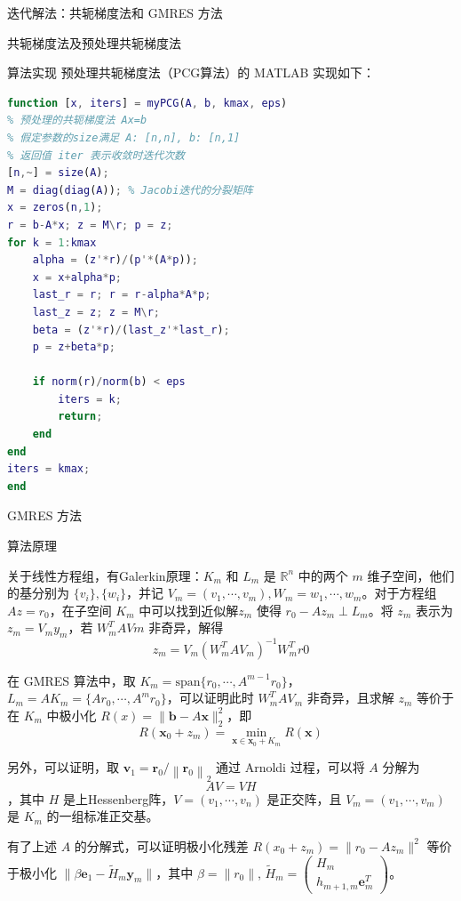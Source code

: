 \documentclass[a4paper]{article}
\begin{document}
\begin{multicols}{2}
\begin{section}{迭代解法：共轭梯度法和 GMRES 方法}
\begin{subsection}{共轭梯度法及预处理共轭梯度法}
\begin{subsubsection}{算法实现}
			预处理共轭梯度法（PCG算法）的 MATLAB 实现如下：
			
			\begin{lstlisting}[language=Matlab]
function [x, iters] = myPCG(A, b, kmax, eps)
% 预处理的共轭梯度法 Ax=b
% 假定参数的size满足 A: [n,n], b: [n,1]
% 返回值 iter 表示收敛时迭代次数
[n,~] = size(A);
M = diag(diag(A)); % Jacobi迭代的分裂矩阵
x = zeros(n,1);
r = b-A*x; z = M\r; p = z;
for k = 1:kmax
    alpha = (z'*r)/(p'*(A*p));
    x = x+alpha*p;
    last_r = r; r = r-alpha*A*p;
    last_z = z; z = M\r;
    beta = (z'*r)/(last_z'*last_r);
    p = z+beta*p;
    
    if norm(r)/norm(b) < eps
        iters = k;
        return;
    end
end
iters = kmax;
end
			\end{lstlisting}
		
		\end{subsubsection}
		
	\end{subsection}
	
	\begin{subsection}{GMRES 方法}
	
		\begin{subsubsection}{算法原理}
		
			关于线性方程组，有Galerkin原理：$K_m$ 和 $L_m$ 是 $\mathbb{R}^n$ 中的两个 $m$ 维子空间，他们的基分别为 $\{v_i\}, \{w_i\}$，并记 $V_m = (v_1,\cdots,v_m), W_m = {w_1,\cdots,w_m}$。对于方程组 $Az=r_0$，在子空间 $K_m$ 中可以找到近似解$z_m$ 使得 $r_0-Az_m \perp L_m$。将 $z_m$ 表示为 $z_m = V_m y_m$，若 $W_m^TAVm$ 非奇异，解得
			$$z_m = V_m(W_m^TAV_m)^{-1}W_m^Tr0$$
			
			在 GMRES 算法中，取 $K_m = \text{span}\{r_0,\cdots, A^{m-1}r_0\}$，$ L_m=AK_m=\{Ar_0, \cdots, A^mr_0\}$，可以证明此时 $W_m^TAV_m$ 非奇异，且求解 $z_m$ 等价于在 $K_m$ 中极小化 $R(x)=\|\mathbf{b}-A \mathbf{x}\|_{2}^2$，即 $$R(\mathbf{x}_{0}+z_m)=\min _{\mathbf{x} \in \mathbf{x}_{0}+K_{m}} R(\mathbf{x})$$
			
			另外，可以证明，取 $\mathbf{v}_{1}=\mathbf{r}_{0} /\left\|\mathbf{r}_{0}\right\|_{2}$ 通过 Arnoldi 过程，可以将 $A$ 分解为 $$AV = VH$$，其中 $H$ 是上Hessenberg阵，$V = (v_1, \cdots, v_n)$ 是正交阵，且 $V_m = (v_1,\cdots,v_m)$ 是 $K_m$ 的一组标准正交基。
			
			有了上述 $A$ 的分解式，可以证明极小化残差 $R(x_0+z_m) = \|r_0-Az_m\|^2$ 等价于极小化 $\| \beta \mathbf{e}_{1}-\widetilde{H}_{m} \mathbf{y}_{m}\|$，其中 $\beta = \|r_0\|$, $\tilde{H}_{m}=\left(\begin{array}{c}{H_{m}} \\ {h_{m+1, m} \mathbf{e}_{m}^{T}}\end{array}\right)$。
		

\end{subsubsection}
\end{subsection}
\end{section}
\end{multicols}
\end{document}

